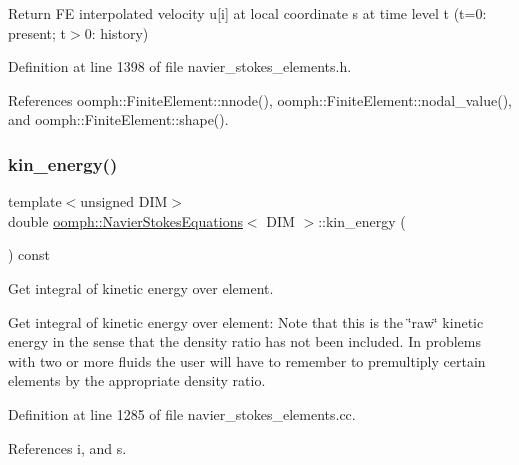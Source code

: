Return FE interpolated velocity u\mbox{[}i\mbox{]} at local coordinate s at time level t (t=0\+: present; t$>$0\+: history) 



Definition at line 1398 of file navier\+\_\+stokes\+\_\+elements.\+h.



References oomph\+::\+Finite\+Element\+::nnode(), oomph\+::\+Finite\+Element\+::nodal\+\_\+value(), and oomph\+::\+Finite\+Element\+::shape().

\mbox{\label{classoomph_1_1NavierStokesEquations_a12ff399b68817da67a079dc378fc8442}} 
\subsubsection{\texorpdfstring{kin\+\_\+energy()}{kin\_energy()}}
{\footnotesize\ttfamily template$<$unsigned D\+IM$>$ \\
double \hyperlink{classoomph_1_1NavierStokesEquations}{oomph\+::\+Navier\+Stokes\+Equations}$<$ D\+IM $>$\+::kin\+\_\+energy (\begin{DoxyParamCaption}{ }\end{DoxyParamCaption}) const}



Get integral of kinetic energy over element. 

Get integral of kinetic energy over element\+: Note that this is the \char`\"{}raw\char`\"{} kinetic energy in the sense that the density ratio has not been included. In problems with two or more fluids the user will have to remember to premultiply certain elements by the appropriate density ratio. 

Definition at line 1285 of file navier\+\_\+stokes\+\_\+elements.\+cc.



References i, and s.

\mbox{\label{classoomph_1_1NavierStokesEquations_ad71edf6c88f76be193e08f19f65f0a18}} 
